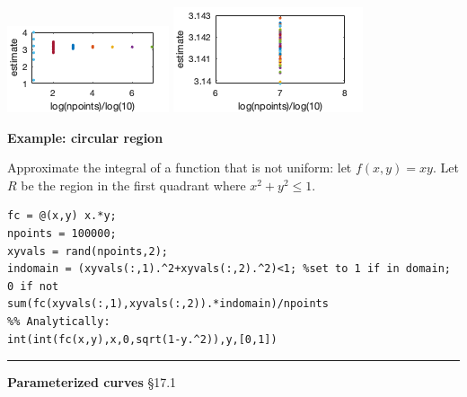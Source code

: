 \documentclass[12pt,letterpaper,noanswers]{exam}
\begin{document}
\includegraphics{img/C15Mpi.png}
\includegraphics{img/C15MCpi7.png}
\vspace{0.1cm}

\noindent\textbf{Example: circular region}

Approximate the integral of a function that is not uniform: let $f(x,y) = xy$.  Let $R$ be the region in the first quadrant where $x^2+y^2\leq 1$.

\begin{lstlisting}
fc = @(x,y) x.*y;
npoints = 100000;
xyvals = rand(npoints,2);
indomain = (xyvals(:,1).^2+xyvals(:,2).^2)<1; %set to 1 if in domain; 0 if not
sum(fc(xyvals(:,1),xyvals(:,2)).*indomain)/npoints
%% Analytically:
int(int(fc(x,y),x,0,sqrt(1-y.^2)),y,[0,1])
\end{lstlisting}

\vspace{1in}




\eject

\vspace{0.2cm}
\hrule
\vspace{0.2cm}

\noindent\textbf{Parameterized curves} \S 17.1 
\end{document}
